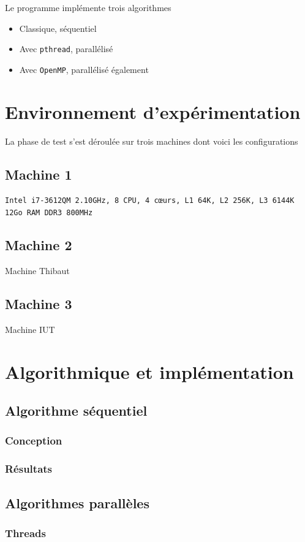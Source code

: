 \documentclass[12pt]{article}
\begin{document}
Le programme implémente trois algorithmes
\begin{itemize}
	\item Classique, séquentiel
	\item Avec \texttt{pthread}\cite{pthreads}, parallélisé
	\item Avec \texttt{OpenMP}, parallélisé également
\end{itemize}

\section{Environnement d'expérimentation}
La phase de test s'est déroulée sur trois machines dont voici les configurations

\subsection{Machine 1}
\texttt{Intel i7-3612QM 2.10GHz, 8 CPU, 4 cœurs, L1 64K, L2 256K, L3 6144K}
\texttt{12Go RAM DDR3 800MHz}

\subsection{Machine 2}
Machine Thibaut

\subsection{Machine 3}
Machine IUT

\section{Algorithmique et implémentation}
	\subsection{Algorithme séquentiel}
		\subsubsection{Conception}
		\subsubsection{Résultats}

	\subsection{Algorithmes parallèles}
		\subsubsection{Threads}
\end{document}
